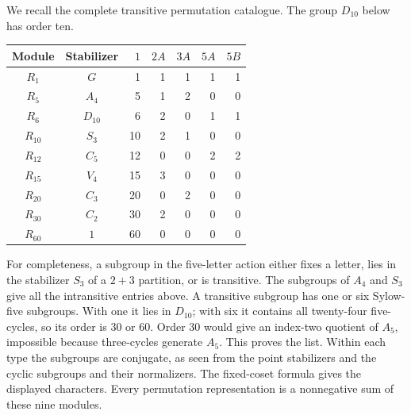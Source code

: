 \documentclass[11pt,a4paper]{article}
\begin{document}
We recall the complete transitive permutation catalogue. The group
$D_{10}$ below has order ten.
\begin{center}\small
\begin{tabular}{c|c|rrrrr}
\toprule
Module&Stabilizer&$1$&$2A$&$3A$&$5A$&$5B$\\\midrule
$R_1$&$G$&1&1&1&1&1\\
$R_5$&$A_4$&5&1&2&0&0\\
$R_6$&$D_{10}$&6&2&0&1&1\\
$R_{10}$&$S_3$&10&2&1&0&0\\
$R_{12}$&$C_5$&12&0&0&2&2\\
$R_{15}$&$V_4$&15&3&0&0&0\\
$R_{20}$&$C_3$&20&0&2&0&0\\
$R_{30}$&$C_2$&30&2&0&0&0\\
$R_{60}$&$1$&60&0&0&0&0\\\bottomrule
\end{tabular}
\end{center}
For completeness, a subgroup in the five-letter action either fixes a
letter, lies in the stabilizer $S_3$ of a $2+3$ partition, or is transitive.
The subgroups of $A_4$ and $S_3$ give all the intransitive entries above.
A transitive subgroup has one or six Sylow-five subgroups. With one it
lies in $D_{10}$; with six it contains all twenty-four five-cycles, so its
order is $30$ or $60$. Order $30$ would give an index-two quotient of
$A_5$, impossible because three-cycles generate $A_5$. This proves the
list. Within each type the subgroups are conjugate, as seen from the point
stabilizers and the cyclic subgroups and their normalizers. The fixed-coset
formula gives the displayed characters. Every permutation representation
is a nonnegative sum of these nine modules.
\end{document}
